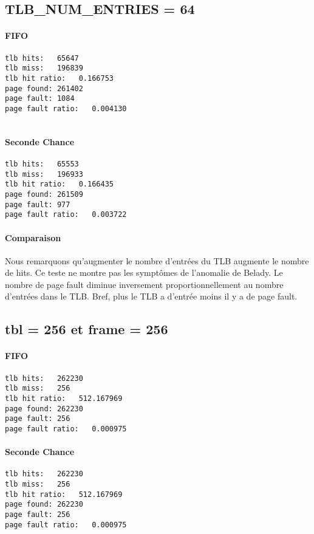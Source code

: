 \documentclass{article}
\begin{document}
\subsection*{TLB\_NUM\_ENTRIES = 64}
\paragraph{FIFO}
\begin{lstlisting}
tlb hits:   65647
tlb miss:   196839
tlb hit ratio:   0.166753
page found: 261402
page fault: 1084
page fault ratio:   0.004130


\end{lstlisting}
\paragraph{Seconde Chance}
\begin{lstlisting}
tlb hits:   65553
tlb miss:   196933
tlb hit ratio:   0.166435
page found: 261509
page fault: 977
page fault ratio:   0.003722
\end{lstlisting}

\paragraph{Comparaison}
Nous remarquons qu'augmenter le nombre d'entrées du TLB augmente le nombre de hits.
Ce teste ne montre pas les symptômes de l'anomalie de Belady. Le nombre de page fault
diminue inversement proportionnellement au nombre d'entrées dans le TLB. Bref, plus le
TLB a d'entrée moins il y a de page fault.

\subsection*{tbl = 256 et frame = 256}
\paragraph{FIFO}
\begin{lstlisting}
tlb hits:   262230
tlb miss:   256
tlb hit ratio:   512.167969
page found: 262230
page fault: 256
page fault ratio:   0.000975
\end{lstlisting}

\paragraph{Seconde Chance}
\begin{lstlisting}
tlb hits:   262230
tlb miss:   256
tlb hit ratio:   512.167969
page found: 262230
page fault: 256
page fault ratio:   0.000975
\end{lstlisting}
\end{document}
